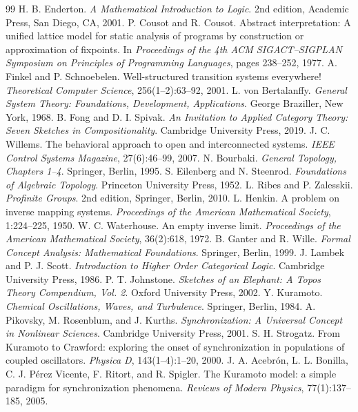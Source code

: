 \documentclass[11pt]{article}
\theoremstyle{definition}
\begin{document}
\begin{thebibliography}{99}
 H. B. Enderton. \emph{A Mathematical Introduction to Logic}. 2nd edition, Academic Press, San Diego, CA, 2001.
 P. Cousot and R. Cousot. Abstract interpretation: A unified lattice model for static analysis of programs by construction or approximation of fixpoints. In \emph{Proceedings of the 4th ACM SIGACT--SIGPLAN Symposium on Principles of Programming Languages}, pages 238--252, 1977.
 A. Finkel and P. Schnoebelen. Well-structured transition systems everywhere! \emph{Theoretical Computer Science}, 256(1--2):63--92, 2001.
 L. von Bertalanffy. \emph{General System Theory: Foundations, Development, Applications}. George Braziller, New York, 1968.
 B. Fong and D. I. Spivak. \emph{An Invitation to Applied Category Theory: Seven Sketches in Compositionality}. Cambridge University Press, 2019.
 J. C. Willems. The behavioral approach to open and interconnected systems. \emph{IEEE Control Systems Magazine}, 27(6):46--99, 2007.
 N. Bourbaki. \emph{General Topology, Chapters 1--4}. Springer, Berlin, 1995.
 S. Eilenberg and N. Steenrod. \emph{Foundations of Algebraic Topology}. Princeton University Press, 1952.
 L. Ribes and P. Zalesskii. \emph{Profinite Groups}. 2nd edition, Springer, Berlin, 2010.
 L. Henkin. A problem on inverse mapping systems. \emph{Proceedings of the American Mathematical Society}, 1:224--225, 1950.
 W. C. Waterhouse. An empty inverse limit. \emph{Proceedings of the American Mathematical Society}, 36(2):618, 1972.
 B. Ganter and R. Wille. \emph{Formal Concept Analysis: Mathematical Foundations}. Springer, Berlin, 1999.
 J. Lambek and P. J. Scott. \emph{Introduction to Higher Order Categorical Logic}. Cambridge University Press, 1986.
 P. T. Johnstone. \emph{Sketches of an Elephant: A Topos Theory Compendium, Vol. 2}. Oxford University Press, 2002.
 Y. Kuramoto. \emph{Chemical Oscillations, Waves, and Turbulence}. Springer, Berlin, 1984.
 A. Pikovsky, M. Rosenblum, and J. Kurths. \emph{Synchronization: A Universal Concept in Nonlinear Sciences}. Cambridge University Press, 2001.
 S. H. Strogatz. From Kuramoto to Crawford: exploring the onset of synchronization in populations of coupled oscillators. \emph{Physica D}, 143(1--4):1--20, 2000.
 J. A. Acebr\'on, L. L. Bonilla, C. J. P\'erez Vicente, F. Ritort, and R. Spigler. The Kuramoto model: a simple paradigm for synchronization phenomena. \emph{Reviews of Modern Physics}, 77(1):137--185, 2005.
\end{thebibliography}
\end{document}
